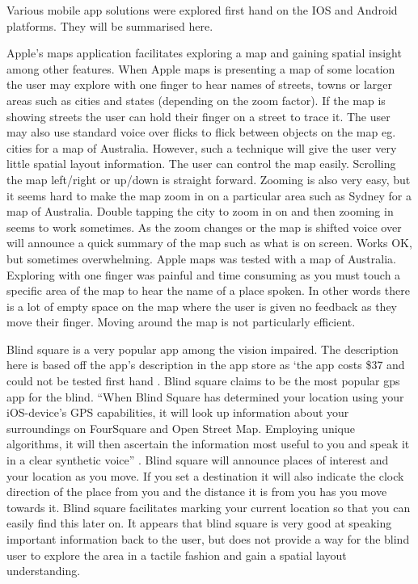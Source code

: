 \documentclass[11pt,twoside,a4paper]{article}
\begin{document}
Various mobile app solutions were explored first hand on the IOS and
Android platforms. They will be summarised here.

Apple's maps application facilitates exploring a map and gaining spatial
insight among other features. When Apple maps is presenting a map of
some location the user may explore with one finger to hear names of
streets, towns or larger areas such as cities and states (depending on
the zoom factor). If the map is showing streets the user can hold their
finger on a street to trace it. The user may also use standard voice
over flicks to flick between objects on the map eg. cities for a map of
Australia. However, such a technique will give the user very little
spatial layout information.  The user can control the map
easily. Scrolling the map left/right or up/down is straight
forward. Zooming is also very easy, but it seems hard to make the map
zoom in on a particular area such as Sydney for a map of
Australia. Double tapping the city to zoom in on and then zooming in
seems to work sometimes. As the zoom changes or the map is shifted voice
over will announce a quick summary of the map such as what is on
screen. Works OK, but sometimes overwhelming.
Apple maps was tested with a map of Australia. Exploring with one finger
was painful and time consuming as you must touch a specific area of the
map to hear the name of a place spoken. In other words there is a lot of
empty space on the map where the user is given no feedback as they move
their finger. Moving around the map is not particularly efficient.

Blind square is a very popular app among the vision impaired. The
description here is based off the app’s description in the app store as
`the app costs \$37 and could not be tested first hand \cite{BlindSquare}.
Blind square claims to be the most popular gps app for the blind. ``When
Blind Square has determined your location using your iOS-device’s GPS
capabilities, it will look up information about your surroundings on
FourSquare and Open Street Map. Employing unique algorithms, it will
then ascertain the information most useful to you and speak it in a
clear synthetic voice'' \cite{BlindSquare}. Blind square will announce places of interest
and your location as you move. If you set a destination it will also
indicate the clock direction of the place from you and the distance it
is from you has you move towards it. Blind square facilitates marking
your current location so that you can easily find this later on. It
appears that blind square is very good at speaking important information
back to the user, but does not provide a way for the blind user to
explore the area in a tactile fashion and gain a spatial layout
understanding.
\end{document}
